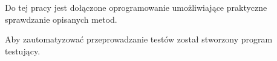 Do tej pracy jest dołączone oprogramowanie umożliwiające praktyczne sprawdzanie
opisanych metod. 

Aby zautomatyzować przeprowadzanie testów został stworzony program testujący. 

